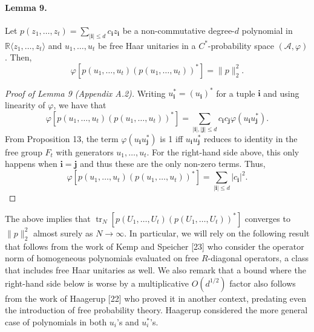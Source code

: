 \paragraph{Lemma 9.}
Let $p(z_1,\ldots,z_t)=\sum_{|\mathbf i|\leq d}c_{\mathbf i}z_{\mathbf i}$ be a non-commutative degree-$d$ polynomial in $\mathbb R\langle z_1,\ldots,z_t\rangle$ and $u_1,\ldots,u_t$ be free Haar unitaries in a $C^*$-probability space $(\mathcal A,\varphi)$. Then,
\[\varphi[p(u_1,\ldots,u_t)(p(u_1,\ldots,u_t))^*]=\|p\|_2^2.\]
\begin{proof}[Proof of Lemma 9 (Appendix A.2)]
Writing $u_{\mathbf i}^*=(u_{\mathbf i})^*$ for a tuple $\mathbf i$ and using linearity of $\varphi$, we have that
\[\varphi[p(u_1,\ldots,u_t)(p(u_1,\ldots,u_t))^*]=\sum_{|\mathbf i|,|\mathbf j|\leq d}c_{\mathbf i}c_{\mathbf j}\varphi(u_{\mathbf i}u_{\mathbf j}^*).\]
From Proposition 13, the term $\varphi(u_{\mathbf i}u_{\mathbf j}^*)$ is 1 iff $u_{\mathbf i}u_{\mathbf j}^*$ reduces to identity in the free group $F_t$ with generators $u_1,\ldots,u_t$. For the right-hand side above, this only happens when $\mathbf i=\mathbf j$ and thus these are the only non-zero terms. Thus,
\[\varphi[p(u_1,\ldots,u_t)(p(u_1,\ldots,u_t))^*]=\sum_{|\mathbf i|\leq d}|c_{\mathbf i}|^2.\]
\end{proof}
The above implies that $\operatorname{tr}_N[p(U_1,\ldots,U_t)(p(U_1,\ldots,U_t))^*]$ converges to $\|p\|_2^2$ almost surely as $N\to\infty$.
In particular, we will rely on the following result that follows from the work of Kemp and Speicher [23] who consider the operator norm of homogeneous polynomials evaluated on free $R$-diagonal operators, a class that includes free Haar unitaries as well. We also remark that a bound where the right-hand side below is worse by a multiplicative $O(d^{1/2})$ factor also follows from the work of Haagerup [22] who proved it in another context, predating even the introduction of free probability theory. Haagerup considered the more general case of polynomials in both $u_i$'s and $u_i^*$'s.
